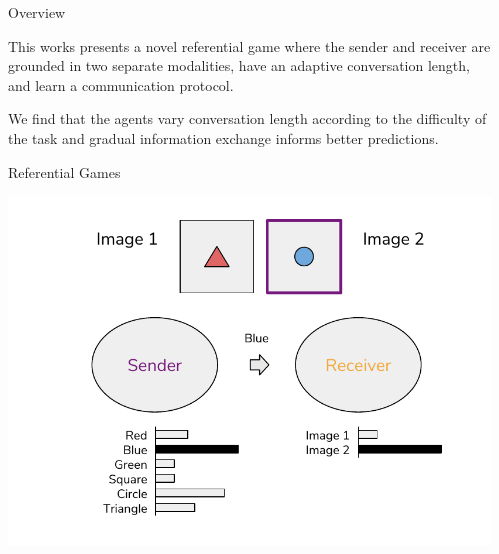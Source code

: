 \documentclass[final]{beamer}
\newlength{\sepwid}
\newlength{\onecolwid}
\begin{document}
\begin{frame}[t] %

\begin{columns}[t] %

\begin{column}{\sepwid}\end{column} %

\begin{column}{\onecolwid} %


\begin{block}{Overview}

This works presents a novel referential game where the sender and receiver are grounded in two separate modalities, have an adaptive conversation length, and learn a communication protocol.

\vspace{5mm}

We find that the agents vary conversation length according to the difficulty of the task and gradual information exchange informs better predictions.

\end{block}

\vspace{5mm}

\begin{block}{Referential Games}

\vspace{-15mm}

\begin{center}
\includegraphics[width=0.8\linewidth]{figures/ref_game_lazaridou.pdf}
\end{center}


\end{block}
\end{column}
\end{columns}
\end{frame}
\end{document}
